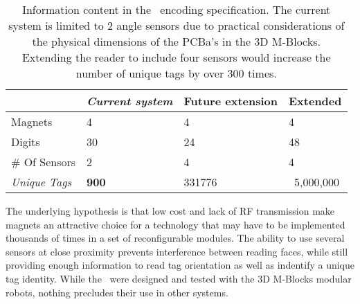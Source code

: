 \begin{table}[b]
	\caption{Information content in the \TagNamePlural~encoding specification. The current system is limited to 2 angle sensors due to practical considerations of the physical dimensions of the  PCBa's in the 3D M-Blocks. Extending the reader to include  four sensors would increase the number of unique tags by over 300 times.}
	
	\begin{tabular}{ p{1.6cm}  p{1.8cm}  p{1.9cm}  p{1.5cm}}
		\hline
								& \textit{Current system} & Future extension & Extended \\
		\hline
				\addlinespace[1ex]
		Magnets  				& 4 			 &	4				&	4	\\
		Digits 					& 30 			 &	24				&	48	\\
		\# Of Sensors 			& 2 			 &	4				&	4	\\
		\textit{Unique Tags} 	& \textbf{900} 	 & 331776			& 	~5,000,000\\
		
	\end{tabular}
	
	\label{tab:hardwareOverview}
\end{table}

The underlying hypothesis is that low cost and lack of RF transmission make magnets an attractive choice for a technology that may have to be implemented thousands of times in a set of reconfigurable modules. The ability to use several sensors at close proximity prevents interference between reading faces, while still providing enough information to read tag orientation as well as indentify a unique tag identity. While the \tagNamePlural~were designed and tested with the 3D M-Blocks modular robots, nothing precludes their use in other systems.

